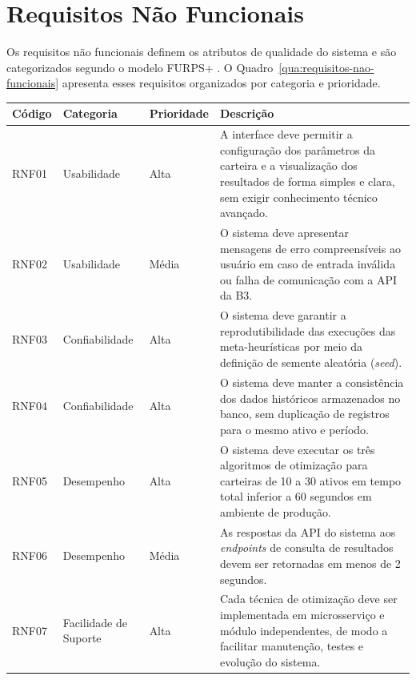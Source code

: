 \documentclass[
	12pt,				%
	openright,			%
	oneside,			    %
	a4paper,				%
	english,			%
	french,			%
	spanish,			%
	brazil			%
	]{abntex2}
\begin{document}
\section{Requisitos Não Funcionais}

Os requisitos não funcionais definem os atributos de qualidade do sistema e são categorizados segundo o modelo FURPS+ \cite{grady1992}. O Quadro~\ref{qua:requisitos-nao-funcionais} apresenta esses requisitos organizados por categoria e prioridade.

\begin{quadro}[htb]
\caption{Requisitos não funcionais do sistema — modelo FURPS+}
\label{qua:requisitos-nao-funcionais}
\begin{tabularx}{\textwidth}{|p{1.5cm}|p{2.8cm}|p{1.8cm}|X|}
\hline
\rowcolor[HTML]{BDD7EE}
\textbf{Código} & \textbf{Categoria} & \textbf{Prioridade} & \textbf{Descrição} \\ \hline
RNF01 & Usabilidade & Alta &
  A interface deve permitir a configuração dos parâmetros da carteira e a visualização dos resultados de forma simples e clara, sem exigir conhecimento técnico avançado. \\ \hline
RNF02 & Usabilidade & Média &
  O sistema deve apresentar mensagens de erro compreensíveis ao usuário em caso de entrada inválida ou falha de comunicação com a API da B3. \\ \hline
RNF03 & Confiabilidade & Alta &
  O sistema deve garantir a reprodutibilidade das execuções das meta-heurísticas por meio da definição de semente aleatória (\textit{seed}). \\ \hline
RNF04 & Confiabilidade & Alta &
  O sistema deve manter a consistência dos dados históricos armazenados no banco, sem duplicação de registros para o mesmo ativo e período. \\ \hline
RNF05 & Desempenho & Alta &
  O sistema deve executar os três algoritmos de otimização para carteiras de 10 a 30 ativos em tempo total inferior a 60 segundos em ambiente de produção. \\ \hline
RNF06 & Desempenho & Média &
  As respostas da API do sistema aos \textit{endpoints} de consulta de resultados devem ser retornadas em menos de 2 segundos. \\ \hline
RNF07 & Facilidade de Suporte & Alta &
  Cada técnica de otimização deve ser implementada em microsserviço e módulo independentes, de modo a facilitar manutenção, testes e evolução do sistema. \\ \hline

\end{tabularx}
\end{quadro}
\end{document}
